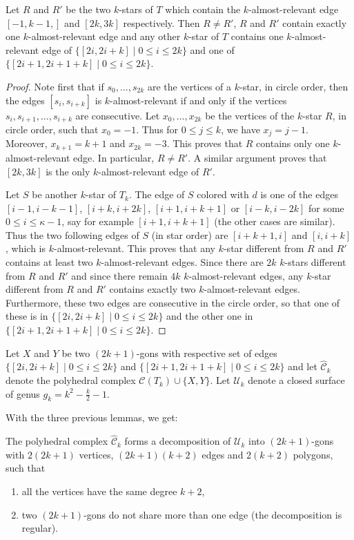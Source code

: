 \documentclass[12pt]{amsart}
\begin{document}
\begin{lemma}
Let $R$ and $R'$ be the two $k$-stars of $T$ which contain the $k$-almost-relevant edge $[-1,k-1,]$ and $[2k,3k]$ respectively. Then $R\ne R'$, $R$ and $R'$ contain exactly one $k$-almost-relevant edge and any other $k$-star of $T$ contains one $k$-almost-relevant edge of $\{[2i,2i+k]\;|\; 0\le i\le 2k\}$ and one of $\{[2i+1,2i+1+k]\;|\; 0\le i\le 2k\}$.
\end{lemma}

\begin{proof}
Note first that if $s_0,\ldots,s_{2k}$ are the vertices of a $k$-star, in circle order, then the edges $[s_i,s_{i+k}]$ is $k$-almost-relevant if and only if the vertices $s_i,s_{i+1},\ldots, s_{i+k}$ are consecutive.
Let $x_0,\ldots,x_{2k}$ be the vertices of the $k$-star $R$, in circle order, such that $x_0=-1$. Thus for $0\le j\le k$, we have $x_j=j-1$. Moreover, $x_{k+1}=k+1$ and $x_{2k}=-3$. This proves that $R$ contains only one $k$-almost-relevant edge. In particular, $R\ne R'$.
A similar argument proves that $[2k,3k]$ is the only $k$-almost-relevant edge of $R'$.

\bigskip
Let $S$ be another $k$-star of $T_k$. The edge of $S$ colored with $d$ is one of the edges $[i-1,i-k-1]$, $[i+k,i+2k]$, $[i+1,i+k+1]$ or $[i-k,i-2k]$ for some $0\le i\le \kappa-1$, say for example $[i+1,i+k+1]$ (the other cases are similar). Thus the two following edges of $S$ (in star order) are $[i+k+1,i]$ and $[i,i+k]$, which is $k$-almost-relevant. This proves that any $k$-star different from $R$ and $R'$ contains at least two $k$-almost-relevant edges. Since there are $2k$ $k$-stars different from $R$ and $R'$ and since there remain $4k$ $k$-almost-relevant edges, any $k$-star different from $R$ and $R'$ contains exactly two $k$-almost-relevant edges. Furthermore, these two edges are consecutive in the circle order, so that one of these is in $\{[2i,2i+k]\;|\; 0\le i\le 2k\}$ and the other one in $\{[2i+1,2i+1+k]\;|\; 0\le i\le 2k\}$.
\end{proof}


Let $X$ and $Y$ be two $(2k+1)$-gons with respective set of edges $\{[2i,2i+k]\;|\; 0\le i\le 2k\}$ and $\{[2i+1,2i+1+k]\;|\; 0\le i\le 2k\}$ and let $\hat{\mathcal{C}}_k$ denote the polyhedral complex $\mathcal{C}(T_k)\cup\{X,Y\}$.
Let $\mathcal{U}_k$ denote a closed surface of genus $g_k=k^2-\frac{k}{2}-1$.

With the three previous lemmas, we get:

\begin{corollary}
The polyhedral complex $\hat{\mathcal{C}}_k$ forms a decomposition of $\mathcal{U}_k$ into $(2k+1)$-gons with $2(2k+1)$ vertices, $(2k+1)(k+2)$ edges and $2(k+2)$ polygons, such that
\begin{enumerate}
\item all the vertices have the same degree $k+2$,
\item two $(2k+1)$-gons do not share more than one edge (the decomposition is regular).
\end{enumerate}
\end{corollary}
\end{document}
